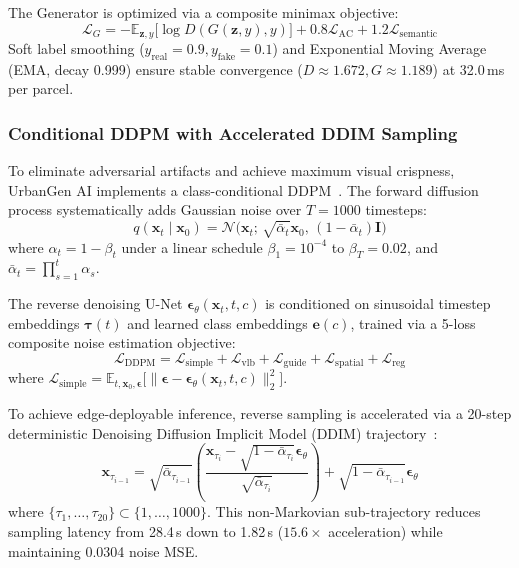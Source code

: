 \documentclass[journal]{IEEEtran}
\begin{document}
The Generator is optimized via a composite minimax objective:
\begin{equation}
\mathcal{L}_G = -\mathbb{E}_{\mathbf{z}, y}\big[\log D(G(\mathbf{z}, y), y)\big] + 0.8\mathcal{L}_{\text{AC}} + 1.2\mathcal{L}_{\text{semantic}}
\label{eq:gan_g_loss}
\end{equation}
Soft label smoothing ($y_{\text{real}} = 0.9, y_{\text{fake}} = 0.1$) and Exponential Moving Average (EMA, decay 0.999) ensure stable convergence ($D \approx 1.672, G \approx 1.189$) at 32.0\,ms per parcel.

\subsubsection{Conditional DDPM with Accelerated DDIM Sampling}
To eliminate adversarial artifacts and achieve maximum visual crispness, UrbanGen AI implements a class-conditional DDPM~\cite{sohl2015deep,ho2020denoising}. The forward diffusion process systematically adds Gaussian noise over $T = 1000$ timesteps:
\begin{equation}
q(\mathbf{x}_t \mid \mathbf{x}_0) = \mathcal{N}\Big(\mathbf{x}_t;\, \sqrt{\bar{\alpha}_t}\mathbf{x}_0,\, (1 - \bar{\alpha}_t)\mathbf{I}\Big)
\label{eq:ddpm_forward}
\end{equation}
where $\alpha_t = 1 - \beta_t$ under a linear schedule $\beta_1 = 10^{-4}$ to $\beta_T = 0.02$, and $\bar{\alpha}_t = \prod_{s=1}^t \alpha_s$.

The reverse denoising U-Net $\bm{\epsilon}_\theta(\mathbf{x}_t, t, c)$ is conditioned on sinusoidal timestep embeddings $\bm{\tau}(t)$ and learned class embeddings $\mathbf{e}(c)$, trained via a 5-loss composite noise estimation objective:
\begin{equation}
\mathcal{L}_{\text{DDPM}} = \mathcal{L}_{\text{simple}} + \mathcal{L}_{\text{vlb}} + \mathcal{L}_{\text{guide}} + \mathcal{L}_{\text{spatial}} + \mathcal{L}_{\text{reg}}
\label{eq:ddpm_loss}
\end{equation}
where $\mathcal{L}_{\text{simple}} = \mathbb{E}_{t, \mathbf{x}_0, \bm{\epsilon}}\big[\|\bm{\epsilon} - \bm{\epsilon}_\theta(\mathbf{x}_t, t, c)\|_2^2\big]$.

To achieve edge-deployable inference, reverse sampling is accelerated via a 20-step deterministic Denoising Diffusion Implicit Model (DDIM) trajectory~\cite{song2020denoising}:
\begin{equation}
\mathbf{x}_{\tau_{i-1}} = \sqrt{\bar{\alpha}_{\tau_{i-1}}} \left(\frac{\mathbf{x}_{\tau_i} - \sqrt{1 - \bar{\alpha}_{\tau_i}}\bm{\epsilon}_\theta}{\sqrt{\bar{\alpha}_{\tau_i}}}\right) + \sqrt{1 - \bar{\alpha}_{\tau_{i-1}}}\bm{\epsilon}_\theta
\label{eq:ddim_step}
\end{equation}
where $\{\tau_1, \dots, \tau_{20}\} \subset \{1, \dots, 1000\}$. This non-Markovian sub-trajectory reduces sampling latency from 28.4\,s down to 1.82\,s ($15.6\times$ acceleration) while maintaining 0.0304 noise MSE.
\end{document}
